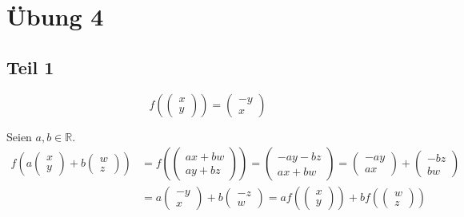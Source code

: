 \documentclass[a4paper,10pt]{article}
\begin{document}
\section*{Übung 4}

\subsection*{Teil 1}

\begin{equation}
 f(\begin{pmatrix}x\\y\end{pmatrix}) = \begin{pmatrix}-y\\x\end{pmatrix}
\end{equation}

Seien $a, b \in \mathbb{R}$.
\begin{align*}
 f(a\begin{pmatrix}x\\y\end{pmatrix} + b\begin{pmatrix}w\\z\end{pmatrix}) & = f(\begin{pmatrix}ax + bw\\ay + bz\end{pmatrix}) = \begin{pmatrix}-ay - bz\\ax + bw\end{pmatrix} = \begin{pmatrix}-ay\\ax\end{pmatrix} + \begin{pmatrix}-bz\\bw\end{pmatrix}\\
 & = a\begin{pmatrix}-y\\x\end{pmatrix} + b\begin{pmatrix}-z\\w\end{pmatrix} = af(\begin{pmatrix}x\\y\end{pmatrix}) + bf(\begin{pmatrix}w\\z\end{pmatrix})
\end{align*}
\end{document}
